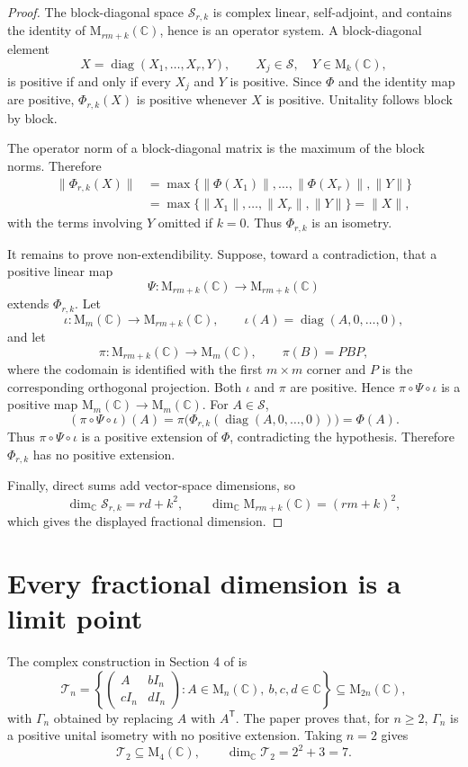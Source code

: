 \documentclass[11pt]{article}
\theoremstyle{remark}
\newcommand{\C}{\mathbb C}
\newcommand{\M}{\mathrm M}
\newcommand{\diag}{\operatorname{diag}}
\begin{document}
\begin{proof}
The block-diagonal space $\mathcal S_{r,k}$ is complex linear, self-adjoint, and contains the identity of $\M_{rm+k}(\C)$, hence is an operator system.  A block-diagonal element
\[
 X=\diag(X_1,\ldots,X_r,Y),
 \qquad X_j\in\mathcal S,\quad Y\in\M_k(\C),
\]
is positive if and only if every $X_j$ and $Y$ is positive.  Since $\Phi$ and the identity map are positive, $\Phi_{r,k}(X)$ is positive whenever $X$ is positive.  Unitality follows block by block.

The operator norm of a block-diagonal matrix is the maximum of the block norms.  Therefore
\begin{align*}
 \|\Phi_{r,k}(X)\|
 &=\max\bigl\{\|\Phi(X_1)\|,\ldots,\|\Phi(X_r)\|,\|Y\|\bigr\}\\
 &=\max\bigl\{\|X_1\|,\ldots,\|X_r\|,\|Y\|\bigr\}
 =\|X\|,
\end{align*}
with the terms involving $Y$ omitted if $k=0$.  Thus $\Phi_{r,k}$ is an isometry.

It remains to prove non-extendibility.  Suppose, toward a contradiction, that a positive linear map
\[
 \Psi:\M_{rm+k}(\C)\longrightarrow\M_{rm+k}(\C)
\]
extends $\Phi_{r,k}$.  Let
\[
 \iota:\M_m(\C)\to\M_{rm+k}(\C),\qquad
 \iota(A)=\diag(A,0,\ldots,0),
\]
and let
\[
 \pi:\M_{rm+k}(\C)\to\M_m(\C),\qquad
 \pi(B)=PBP,
\]
where the codomain is identified with the first $m\times m$ corner and $P$ is the corresponding orthogonal projection.  Both $\iota$ and $\pi$ are positive.  Hence $\pi\circ\Psi\circ\iota$ is a positive map $\M_m(\C)\to\M_m(\C)$.  For $A\in\mathcal S$,
\[
 (\pi\circ\Psi\circ\iota)(A)
 =\pi\bigl(\Phi_{r,k}(\diag(A,0,\ldots,0))\bigr)
 =\Phi(A).
\]
Thus $\pi\circ\Psi\circ\iota$ is a positive extension of $\Phi$, contradicting the hypothesis.  Therefore $\Phi_{r,k}$ has no positive extension.

Finally, direct sums add vector-space dimensions, so
\[
 \dim_{\C}\mathcal S_{r,k}=rd+k^2,
 \qquad
 \dim_{\C}\M_{rm+k}(\C)=(rm+k)^2,
\]
which gives the displayed fractional dimension.
\end{proof}

\section{Every fractional dimension is a limit point}

The complex construction in Section 4 of \cite{CDPR} is
\[
 \mathcal T_n=
 \left\{
 \begin{pmatrix}A&bI_n\\cI_n&dI_n\end{pmatrix}:
 A\in\M_n(\C),\ b,c,d\in\C
 \right\}\subseteq\M_{2n}(\C),
\]
with $\Gamma_n$ obtained by replacing $A$ with $A^{\mathsf T}$.  The paper proves that, for $n\geq2$, $\Gamma_n$ is a positive unital isometry with no positive extension.  Taking $n=2$ gives
\[
  \mathcal T_2\subseteq\M_4(\C),
  \qquad \dim_{\C}\mathcal T_2=2^2+3=7.
\]
\end{document}

